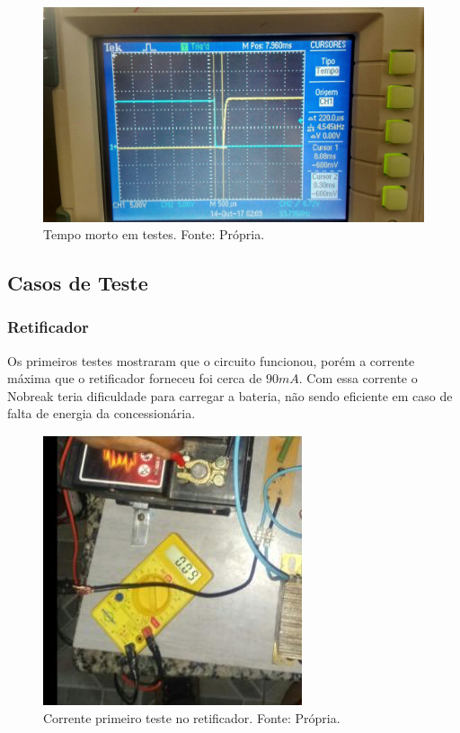                 \begin{figure}[!htb]
            		\centering
            		\includegraphics[scale= 0.2]{figuras/Tempo_morto.jpg}
            		\caption{Tempo morto em testes. Fonte: Própria.}
            		\label{tempo-morto}
            	\end{figure}
       

        \subsection[Casos de Teste]{Casos de Teste}
            \subsubsection[Retificador]{Retificador}       
           	Os primeiros testes mostraram que o circuito funcionou, porém a corrente 						máxima que o retificador forneceu foi cerca de $90mA$. Com essa corrente o 						Nobreak teria dificuldade para carregar a bateria, não sendo eficiente em caso 				de falta de energia da concessionária. 
            	
                \begin{figure}[!htb]
            		\centering
            		\includegraphics[scale= 0.6]{figuras/corrente_retificador.jpeg}
            		\caption{Corrente primeiro teste no retificador. Fonte: Própria.}
            		\label{corrente-retificador}
            	\end{figure}            	
             

